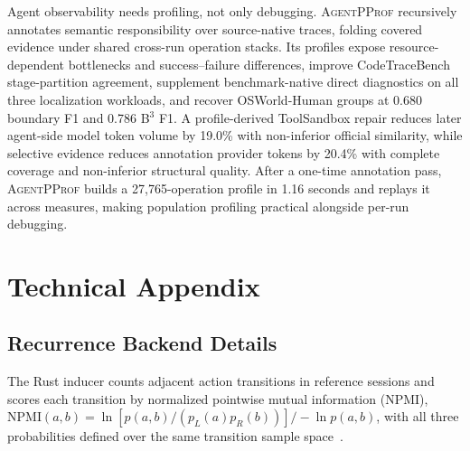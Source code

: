 \documentclass[letterpaper]{article}
\newcommand{\sys}{\textsc{AgentPProf}\xspace}
\begin{document}
Agent observability needs profiling, not only debugging. \sys recursively
annotates semantic responsibility over source-native traces, folding covered
evidence under shared cross-run operation stacks. Its profiles expose
resource-dependent bottlenecks and success--failure differences, improve
CodeTraceBench stage-partition agreement, supplement benchmark-native direct
diagnostics on all three localization workloads, and recover OSWorld-Human
groups at 0.680 boundary F1 and 0.786 B$^3$ F1. A profile-derived ToolSandbox
repair reduces later agent-side model token volume by 19.0\% with
non-inferior official similarity, while selective evidence reduces annotation
provider tokens by 20.4\% with complete coverage and non-inferior structural
quality. After a one-time annotation pass, \sys builds a 27{,}765-operation
profile in 1.16 seconds and replays it across measures, making population
profiling practical alongside per-run debugging.



\clearpage
\appendix
\section{Technical Appendix}
\label{sec:appendix}

\subsection{Recurrence Backend Details}
\label{app:recurrence}

The Rust inducer counts adjacent action transitions in reference sessions and
scores each transition by normalized pointwise mutual information (NPMI),
$\mathrm{NPMI}(a,b)=
\ln[p(a,b)/(p_L(a)p_R(b))]/-\ln p(a,b)$, with all three probabilities defined
over the same transition sample space~\cite{bouma2009npmi}.
\end{document}
